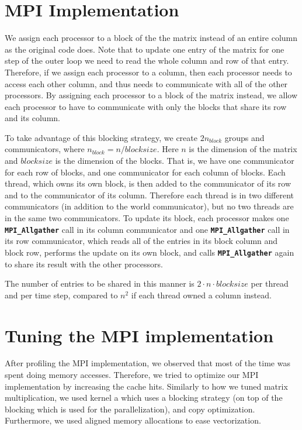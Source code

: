 \documentclass[11pt]{article}
\begin{document}
\section{MPI Implementation}
We assign each processor to a block of the the matrix instead of an entire column as the original code does.
Note that to update one entry of the matrix for one step of the outer loop we need to read the whole column and row of that entry. Therefore, if we assign each processor to a column, then each processor needs to access each other column, and thus needs to communicate with all of the other processors. By assigning each processor to a block of the matrix instead, we allow each processor to have to communicate with only the blocks that share its row and its column.

To take advantage of this blocking strategy, we create $2n_{block}$ groups and communicators, where $n_{block}=n/blocksize$. Here $n$  is the dimension of the matrix and $blocksize$ is the dimension of the blocks. That is, we have one communicator for each row of blocks, and one communicator for each column of blocks. Each thread, which owns its own block, is then added to the communicator of its row and to the communicator of its column. Therefore each thread is in two different communicators (in addition to the world communicator), but no two threads are in the same two communicators. To update its block, each processor makes one \textbf{\texttt{MPI\_Allgather}} call in its column communicator and one \textbf{ \texttt{MPI\_Allgather}} call in its row communicator, which reads all of the entries in its block column and block row, performs the update on its own block, and calls \textbf{\texttt{MPI\_Allgather}} again to share its result with the other processors.

The number of entries to be shared in this manner is $2 \cdot n \cdot blocksize$ per thread and per time step, compared to $n^2$ if each thread owned a column instead.

\section{Tuning the MPI implementation}
After profiling the MPI implementation, we observed that most of the time was spent doing memory accesses. Therefore, we tried to optimize our MPI implementation by increasing the cache hits. Similarly to how we tuned matrix multiplication, we used kernel a which uses a blocking strategy (on top of the blocking which is used for the parallelization), and copy optimization. Furthermore, we used aligned memory allocations to ease vectorization. 
\end{document}

